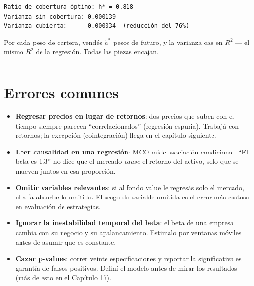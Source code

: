\documentclass[
  spanish,
  letterpaper,
  DIV=11,
  numbers=noendperiod]{scrreprt}
\providecommand{\tightlist}{%
  \setlength{\itemsep}{0pt}\setlength{\parskip}{0pt}}
\begin{document}
\begin{verbatim}
Ratio de cobertura óptimo: h* = 0.818
Varianza sin cobertura: 0.000139
Varianza cubierta:      0.000034  (reducción del 76%)
\end{verbatim}

Por cada peso de cartera, vendés \(h^*\) pesos de futuro, y la varianza
cae en \(R^2\) --- el mismo \(R^2\) de la regresión. Todas las piezas
encajan.

\begin{center}\rule{0.5\linewidth}{0.5pt}\end{center}

\chapter{Errores comunes}\label{errores-comunes-13}

\begin{tcolorbox}[enhanced jigsaw, bottomrule=.15mm, colback=white, opacitybacktitle=0.6, arc=.35mm, toprule=.15mm, opacityback=0, breakable, titlerule=0mm, left=2mm, coltitle=black, colbacktitle=quarto-callout-warning-color!10!white, colframe=quarto-callout-warning-color-frame, leftrule=.75mm, toptitle=1mm, bottomtitle=1mm, title=\textcolor{quarto-callout-warning-color}{\faExclamationTriangle}\hspace{0.5em}{Trampas frecuentes}, rightrule=.15mm]

\begin{itemize}
\tightlist
\item
  \textbf{Regresar precios en lugar de retornos}: dos precios que suben
  con el tiempo siempre parecen ``correlacionados'' (regresión espuria).
  Trabajá con retornos; la excepción (cointegración) llega en el
  capítulo siguiente.
\item
  \textbf{Leer causalidad en una regresión}: MCO mide asociación
  condicional. ``El beta es 1.3'' no dice que el mercado \emph{cause} el
  retorno del activo, solo que se mueven juntos en esa proporción.
\item
  \textbf{Omitir variables relevantes}: si al fondo value le regresás
  solo el mercado, el alfa absorbe lo omitido. El sesgo de variable
  omitida es el error más costoso en evaluación de estrategias.
\item
  \textbf{Ignorar la inestabilidad temporal del beta}: el beta de una
  empresa cambia con su negocio y su apalancamiento. Estimalo por
  ventanas móviles antes de asumir que es constante.
\item
  \textbf{Cazar p-values}: correr veinte especificaciones y reportar la
  significativa es garantía de falsos positivos. Definí el modelo antes
  de mirar los resultados (más de esto en el Capítulo 17).
\end{itemize}

\end{tcolorbox}
\end{document}

